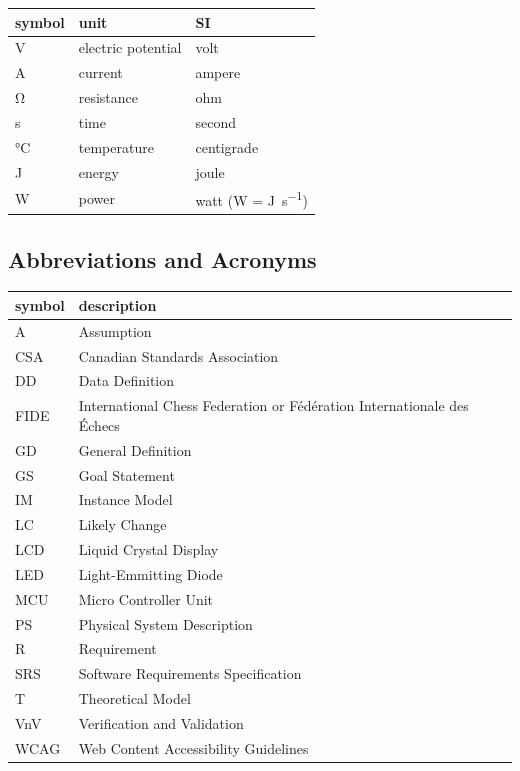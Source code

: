 \documentclass[12pt]{article}
\begin{document}
\begin{table}[ht]
  \noindent \begin{tabular}{l l l} 
    \toprule		
    \textbf{symbol} & \textbf{unit} & \textbf{SI}\\
    \midrule 
    \si{\volt} & electric potential & volt\\
    \si{\ampere} & current	& ampere\\
    \si{\ohm} & resistance	& ohm\\
    \si{\second} & time & second\\
    \si{\celsius} & temperature & centigrade\\
    \si{\joule} & energy & joule\\
    \si{\watt} & power & watt (W = \si{\joule\per\second})\\
    \bottomrule
  \end{tabular}
\end{table}

\newpage

\subsection{Abbreviations and Acronyms}
\begin{tabular}{l l} 
  \toprule		
  \textbf{symbol} & \textbf{description}\\
  \midrule 
  A & Assumption\\
  CSA & Canadian Standards Association\\
  DD & Data Definition\\
  FIDE & International Chess Federation or Fédération Internationale des Échecs\\
  GD & General Definition\\
  GS & Goal Statement\\
  IM & Instance Model\\
  LC & Likely Change\\
  LCD & Liquid Crystal Display\\
  LED & Light-Emmitting Diode\\
  MCU & Micro Controller Unit\\
  PS & Physical System Description\\
  R & Requirement\\
  SRS & Software Requirements Specification\\
  T & Theoretical Model\\
  VnV & Verification and Validation\\
  WCAG & Web Content Accessibility Guidelines\\
  \bottomrule
\end{tabular}\\
\end{document}

